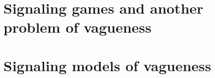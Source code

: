 \documentclass[a4paper]{article}
\begin{document}

\section{Signaling games and another problem of vagueness}
\label{sec:signaling-and-Lipman}

\section{Signaling models of vagueness}
\label{sec:vague-signaling}


\printbibliography
\end{document}
